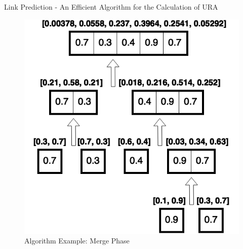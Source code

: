 \documentclass[9pt]{beamer}
\begin{document}
\begin{frame}{Link Prediction - An Efficient Algorithm for the Calculation of URA}


\begin{figure}
\includegraphics[scale = 0.35]{5_sample_conquer.png}
\centering
\caption{Algorithm Example: Merge Phase}
\label{example}
\end{figure}


\end{frame}
\end{document}
